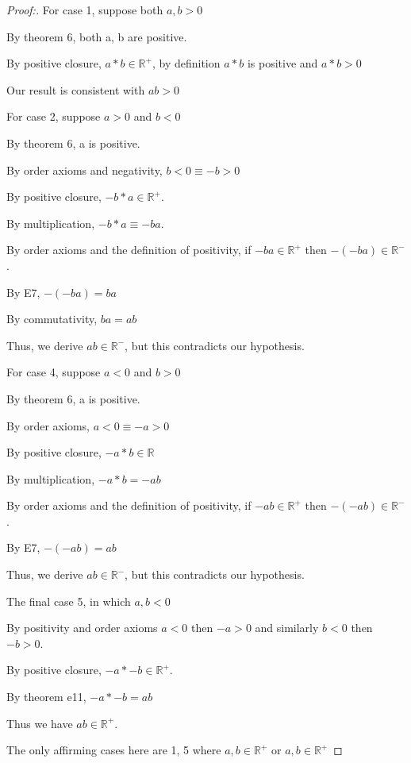 \documentclass[12pt]{article}
\begin{document}
\begin{proof}[Proof:]
    \newpage

    For case 1, suppose both $a, b > 0$

    By theorem 6, both a, b are positive.

    By positive closure, $a * b \in \mathbb{R^+}$, by definition $a * b$ is positive and $a * b > 0$

    Our result is consistent with $ab > 0$

    For case 2, suppose $a > 0$ and $b < 0$

    By theorem 6, a is positive.

    By order axioms and negativity, $b < 0 \equiv -b > 0$ 

    By positive closure, $-b * a \in \mathbb{R^+}$.

    By multiplication, $-b * a \equiv -ba$.

    By order axioms and the definition of positivity, if $-ba \in \mathbb{R^+}$ then $-(-ba) \in \mathbb{R^-}$.

    By E7, $-(-ba) = ba$

    By commutativity, $ba = ab$

    Thus, we derive $ab \in \mathbb{R^-}$, but this contradicts our hypothesis.

    For case 4, suppose $a < 0$ and $b > 0$

    By theorem 6, a is positive.

    By order axioms, $a < 0 \equiv -a > 0$

    By positive closure, $-a * b \in \mathbb{R}$

    By multiplication, $-a * b = -ab$

    By order axioms and the definition of positivity, if $-ab \in \mathbb{R^+}$ then $-(-ab) \in \mathbb{R^-}$.

    By E7, $-(-ab) = ab$

    Thus, we derive $ab \in \mathbb{R^-}$, but this contradicts our hypothesis.

    The final case 5, in which $a, b < 0$

    By positivity and order axioms $a < 0$ then $-a > 0$ and similarly $b < 0$ then $-b > 0$.

    By positive closure, $-a * -b \in \mathbb{R^+}$.

    By theorem e11, $-a * -b = ab$

    Thus we have $ab \in \mathbb{R^+}$.

    The only affirming cases here are 1, 5 where $a,b \in \mathbb{R^+}$ or $a, b \in \mathbb{R^+}$


\end{proof}
\end{document}
